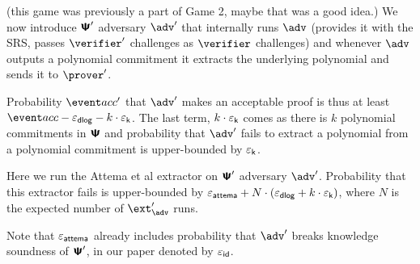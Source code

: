  {(this game was previously a part of Game 2, maybe that was a good idea.)
  We now introduce $\bm{\mathsf{\Psi}}'$ adversary $\adv'$ that internally runs $\adv$ (provides
  it with the SRS, passes $\verifier'$ challenges as $\verifier$ challenges) and whenever
  $\adv$ outputs a polynomial commitment it extracts the underlying polynomial and sends
  it to $\prover'$.

  Probability $\accProb'$ that $\adv'$ makes an acceptable proof is thus at least
  $\accProb - \epsdlog - k \cdot \epsk$. The last term, $k \cdot \varepsilon_{\mathsf{k}}$ comes as there is
  $k$ polynomial commitments in $\bm{\mathsf{\Psi}}$ and probability that $\adv'$ fails to
  extract a polynomial from a polynomial commitment is upper-bounded by $\varepsilon_{\mathsf{k}}$.
}


  { Here we run the Attema et al extractor on $\bm{\mathsf{\Psi}}'$
  adversary $\adv'$. Probability that this extractor fails is upper-bounded by
  $\varepsilon_{\mathsf{attema}} + N \cdot (\varepsilon_{\mathsf{dlog}} + k \cdot \varepsilon_{\mathsf{k}})$, where $N$ is the expected number of
  $\ext'_{\adv}$ runs.

  Note that $\varepsilon_{\mathsf{attema}}$ already includes
  probability that $\adv'$ breaks knowledge soundness of $\bm{\mathsf{\Psi}}'$, in our paper
  denoted by $\varepsilon_{\mathsf{id}}$.  }




